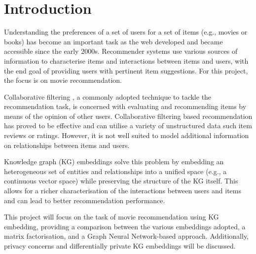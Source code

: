 




\maketitle



\section{Introduction}\label{sec:introduction}

Understanding the preferences of a set of users for a set of items (e.g., movies or books) has become an important task as the web developed and became accessible since the early 2000s.
Recommender systems \parencite{bobadilla2013recommender} use various sources of information to characterise items and interactions between items and users, with the end goal of providing users with pertinent item suggestions.
For this project, the focus is on movie recommendation.

Collaborative filtering \parencite{schafer2007collaborative}, a commonly adopted technique to tackle the recommendation task, is concerned with evaluating and recommending items by means of the opinion of other users.
Collaborative filtering based recommendation has proved to be effective \parencite{schafer2007collaborative, herlocker2004evaluating} and can utilise a variety of unstructured data such item reviews or ratings.
However, it is not well suited to model additional information on relationships between items and users.

Knowledge graph (KG) embeddings \parencite{wang2017knowledge} solve this problem by embedding an heterogeneous set of entities and relationships into a unified space (e.g., a continuous vector space) while preserving the structure of the KG itself.
This allows for a richer characterisation of the interactions between users and items and can lead to better recommendation performance.

This project will focus on the task of movie recommendation  using KG embedding, providing a comparison between the various embeddings adopted, a matrix factorisation, and a Graph Neural Network-based approach.
Additionally, privacy concerns and differentially private KG embeddings will be discussed.








